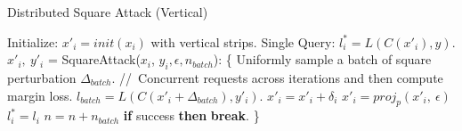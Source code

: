 \begin{minipage}{0.9\textwidth}
\begin{algorithm}[H]
    \centering
    \caption{Distributed Square Attack (Vertical)}
    \label{alg:square_vertical}
    \begin{algorithmic}
            \STATE Initialize: $x'_{i} = init(x_{i})$ with vertical strips.
            \STATE Single Query: $l^{*}_i = L(C(x'_i), y)$.
            \STATE $x'_{i},\ y'_{i}$ = SquareAttack($x_{i}$, $y_{i},\epsilon, n_{batch}$):
            \STATE \{
            \bindent
                \FOR {each iteration $n \in [0,\ n_{iter})$}
                    \STATE Uniformly sample a batch of square perturbation $\Delta_{batch}$.
                    \STATE //\ Concurrent requests across iterations and then compute margin loss.
                    \STATE $l_{batch} = L(C(x'_i + \Delta_{batch}), y'_i)$.
                            \STATE $x'_i = x'_i + \delta_i$
                            \STATE $x'_i = proj_{p}(x'_i,\ \epsilon)$
                            \STATE $l^{*}_i = l_i$
                        \ENDIF
                    \ENDFOR
                    \STATE $n = n + n_{batch}$
                    \STATE \textbf{if} {success} \textbf{then} {\textbf{break}}.
                \ENDFOR
            \eindent
            \STATE \}
        \ENDFOR
    \end{algorithmic}
\end{algorithm}
\end{minipage}

